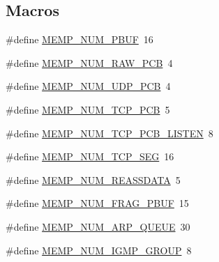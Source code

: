 \subsection*{Macros}
\begin{DoxyCompactItemize}
\item 
\#define \hyperlink{group__lwip__opts__memp_ga92b30aed958ec59334d936d4ca725418}{M\+E\+M\+P\+\_\+\+N\+U\+M\+\_\+\+P\+B\+UF}~16
\item 
\#define \hyperlink{group__lwip__opts__memp_ga379bf92ed322cda54cb701337421e0d3}{M\+E\+M\+P\+\_\+\+N\+U\+M\+\_\+\+R\+A\+W\+\_\+\+P\+CB}~4
\item 
\#define \hyperlink{group__lwip__opts__memp_ga2c416da481ab09bd1ba257b75a0707eb}{M\+E\+M\+P\+\_\+\+N\+U\+M\+\_\+\+U\+D\+P\+\_\+\+P\+CB}~4
\item 
\#define \hyperlink{group__lwip__opts__memp_ga73beecc19cfbc3114768f9b32b2cd70e}{M\+E\+M\+P\+\_\+\+N\+U\+M\+\_\+\+T\+C\+P\+\_\+\+P\+CB}~5
\item 
\#define \hyperlink{group__lwip__opts__memp_ga04fba6a249123513271dccb4ec26aa5a}{M\+E\+M\+P\+\_\+\+N\+U\+M\+\_\+\+T\+C\+P\+\_\+\+P\+C\+B\+\_\+\+L\+I\+S\+T\+EN}~8
\item 
\#define \hyperlink{group__lwip__opts__memp_gaa35fb3a1a76661e3ffb9722a57092de3}{M\+E\+M\+P\+\_\+\+N\+U\+M\+\_\+\+T\+C\+P\+\_\+\+S\+EG}~16
\item 
\#define \hyperlink{group__lwip__opts__memp_ga169436c5860253b90e25bdba9fdcac86}{M\+E\+M\+P\+\_\+\+N\+U\+M\+\_\+\+R\+E\+A\+S\+S\+D\+A\+TA}~5
\item 
\#define \hyperlink{group__lwip__opts__memp_ga1f66051a654dcd7a4e19bc6aff240630}{M\+E\+M\+P\+\_\+\+N\+U\+M\+\_\+\+F\+R\+A\+G\+\_\+\+P\+B\+UF}~15
\item 
\#define \hyperlink{group__lwip__opts__memp_ga087b00ea20a7edebcad33a1a1353a5d7}{M\+E\+M\+P\+\_\+\+N\+U\+M\+\_\+\+A\+R\+P\+\_\+\+Q\+U\+E\+UE}~30
\item 
\#define \hyperlink{group__lwip__opts__memp_gab648ff95d8ffa4216b95f82a568a5d9a}{M\+E\+M\+P\+\_\+\+N\+U\+M\+\_\+\+I\+G\+M\+P\+\_\+\+G\+R\+O\+UP}~8
\item 

\end{DoxyCompactItemize}
